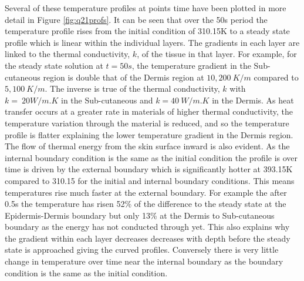 \documentclass[11pt]{article}
\begin{document}
Several of these temperature profiles at points time have been plotted in more detail in Figure \ref{fig:q21profs}. It can be seen  that over the 50s period the temperature profile rises from the initial condition of 310.15K to a steady state profile which is linear within the individual layers. The gradients in each layer are linked to the thermal conductivity, $k$, of the tissue in that layer. For example, for the steady state solution at $t = 50s$, the temperature gradient in the Sub-cutaneous region is double that of the Dermis region at $10,200 \ K/m$ compared to $5,100 \ K/m$. The inverse is true of the thermal conductivity, $k$ with $k = \ 20 W/m.K$ in the Sub-cutaneous and $k = 40 \ W/m.K$ in the Dermis. As heat transfer occurs at a greater rate in materials of higher thermal conductivity, the temperature variation through the material is reduced, and so the temperature profile is flatter explaining the lower temperature gradient in the Dermis region.\\

The flow of thermal energy from the skin surface inward is also evident. As the internal boundary condition is the same as the initial condition the profile is over time is driven by the external boundary which is significantly hotter at 393.15K compared to 310.15 for the initial and internal boundary conditions. This means temperatures rise much faster at the external boundary. For example the after 0.5s the temperature has risen 52\% of the difference to the steady state at the Epidermis-Dermis boundary but only 13\% at the Dermis to Sub-cutaneous boundary as the energy has not conducted through yet. This also explains why the gradient within each layer decreases decreases with depth before the steady state is approached giving the curved profiles. Conversely there is very little change in temperature over time near the internal boundary as the boundary condition is the same as the initial condition.
\FloatBarrier
\end{document}
